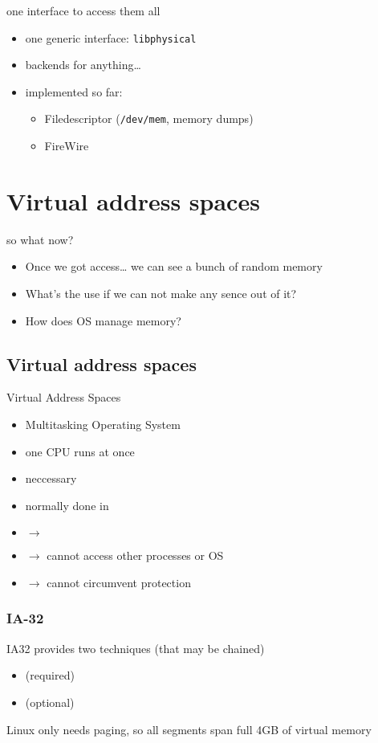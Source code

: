 \documentclass{beamer}
\newenvironment{itemizeframe}[1]
  {\begin{frame}{#1}\startitemizeframe}
  {\stopitemizeframe\end{frame}}
\newcommand\startitemizeframe{\begin{itemize}}
\newcommand\stopitemizeframe{\end{itemize}}
\begin{document}
		\begin{itemizeframe}{one interface to access them all}
			\item one generic interface: \texttt{libphysical}
			\item backends for anything\ldots
			\item implemented so far:
			\begin{itemize}
				\item Filedescriptor (\texttt{/dev/mem}, memory dumps)
				\item FireWire
			\end{itemize}
		\end{itemizeframe}

\section{Virtual address spaces}

	\begin{itemizeframe}{so what now?}
		\item Once we got access\ldots
			we can see a bunch of random memory

		\item What's the use if we can not make any sence out of it?

		\item<2-> How does OS manage memory?
	\end{itemizeframe}

	\subsection{Virtual address spaces}

		\begin{itemizeframe}{Virtual Address Spaces}
			\item Multitasking Operating System
			\item one CPU runs  at once
			\item {} neccessary
			\item normally done in 
			\item<2-> $\rightarrow$ 
			\item<2-> $\rightarrow$ cannot access other processes or OS
			\item<2-> $\rightarrow$ cannot circumvent protection
		\end{itemizeframe}

		\begin{frame} \frametitle{IA-32}
			IA32 provides two techniques (that may be chained)
			\begin{itemize}
				\item {} (required)
				\item {} (optional)
			\end{itemize}
			Linux only needs paging, so all segments span full 4GB of virtual memory
		\end{frame}
\end{document}
